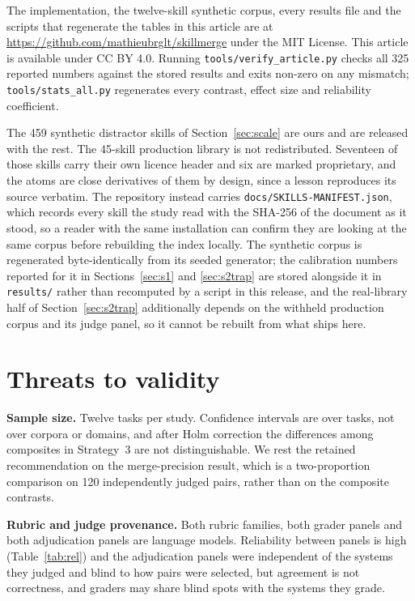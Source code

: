 \documentclass[11pt]{article}
\begin{document}
The implementation, the twelve-skill synthetic corpus, every results file and the scripts that
regenerate the tables in this article are at \url{https://github.com/mathieubrglt/skillmerge} under
the MIT License. This article is available under CC BY 4.0. Running
\texttt{tools/verify\_article.py} checks all 325 reported numbers against the stored results and
exits non-zero on any mismatch; \texttt{tools/stats\_all.py} regenerates every contrast, effect size
and reliability coefficient.

The 459 synthetic distractor skills of Section~\ref{sec:scale} are ours and are released with the
rest. The 45-skill production library is not redistributed. Seventeen of those skills carry their own
licence header and six are marked proprietary, and the atoms are close derivatives of them by
design, since a lesson reproduces its source verbatim. The repository instead carries
\texttt{docs/SKILLS-MANIFEST.json}, which records every skill the study read with the SHA-256 of the
document as it stood, so a reader with the same installation can confirm they are looking at the
same corpus before rebuilding the index locally. The synthetic corpus is regenerated byte-identically
from its seeded generator; the calibration numbers reported for it in Sections~\ref{sec:s1} and
\ref{sec:s2trap} are stored alongside it in \texttt{results/} rather than recomputed by a script in
this release, and the real-library half of Section~\ref{sec:s2trap} additionally depends on the
withheld production corpus and its judge panel, so it cannot be rebuilt from what ships here.

\section{Threats to validity}

\textbf{Sample size.} Twelve tasks per study. Confidence intervals are over tasks, not over corpora
or domains, and after Holm correction the differences among composites in Strategy~3 are not
distinguishable. We rest the retained recommendation on the merge-precision result, which is a
two-proportion comparison on 120 independently judged pairs, rather than on the composite contrasts.

\textbf{Rubric and judge provenance.} Both rubric families, both grader panels and both adjudication
panels are language models. Reliability between panels is high (Table~\ref{tab:rel}) and the
adjudication panels were independent of the systems they judged and blind to how pairs were
selected, but agreement is not correctness, and graders may share blind spots with the systems they
grade.
\end{document}
